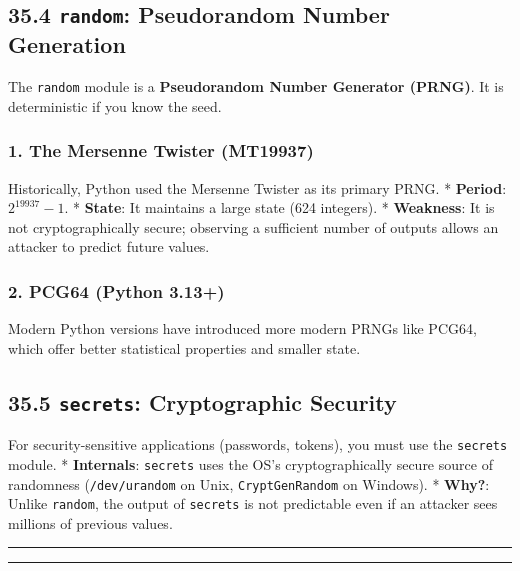 \hypertarget{random-pseudorandom-number-generation}{%
\subsection{\texorpdfstring{35.4 \texttt{random}: Pseudorandom Number
Generation}{35.4 random: Pseudorandom Number Generation}}\label{random-pseudorandom-number-generation}}

The \passthrough{\lstinline!random!} module is a \textbf{Pseudorandom
Number Generator (PRNG)}. It is deterministic if you know the seed.

\hypertarget{the-mersenne-twister-mt19937}{%
\subsubsection{1. The Mersenne Twister
(MT19937)}\label{the-mersenne-twister-mt19937}}

Historically, Python used the Mersenne Twister as its primary PRNG. *
\textbf{Period}: \(2^{19937} - 1\). * \textbf{State}: It maintains a
large state (624 integers). * \textbf{Weakness}: It is not
cryptographically secure; observing a sufficient number of outputs
allows an attacker to predict future values.

\hypertarget{pcg64-python-3.13}{%
\subsubsection{2. PCG64 (Python 3.13+)}\label{pcg64-python-3.13}}

Modern Python versions have introduced more modern PRNGs like PCG64,
which offer better statistical properties and smaller state.

\hypertarget{secrets-cryptographic-security}{%
\subsection{\texorpdfstring{35.5 \texttt{secrets}: Cryptographic
Security}{35.5 secrets: Cryptographic Security}}\label{secrets-cryptographic-security}}

For security-sensitive applications (passwords, tokens), you must use
the \passthrough{\lstinline!secrets!} module. * \textbf{Internals}:
\passthrough{\lstinline!secrets!} uses the OS's cryptographically secure
source of randomness (\passthrough{\lstinline!/dev/urandom!} on Unix,
\passthrough{\lstinline!CryptGenRandom!} on Windows). * \textbf{Why?}:
Unlike \passthrough{\lstinline!random!}, the output of
\passthrough{\lstinline!secrets!} is not predictable even if an attacker
sees millions of previous values.

\begin{center}\rule{0.5\linewidth}{0.5pt}\end{center}

\begin{center}\rule{0.5\linewidth}{0.5pt}\end{center}
